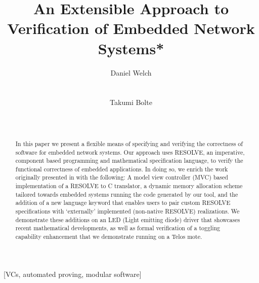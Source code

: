 \documentclass{sig-alternate}
\begin{document}
\title{An Extensible Approach to Verification of Embedded Network Systems*}

\author{
\alignauthor
Daniel Welch\\
\\
\\
\alignauthor
Takumi Bolte\\
\\
\\
}

\maketitle
\begin{abstract}

In this paper we present a flexible means of specifying and verifying the correctness of software for embedded network systems. Our approach uses RESOLVE, an imperative, component based programming and mathematical specification language, to verify the functional correctness of embedded applications. In doing so, we enrich the work originally presented in \cite{regula:2010} with the following: A model view controller (MVC) based implementation of a RESOLVE to C translator, a dynamic memory allocation scheme tailored towards embedded systems running the code generated by our tool, and the addition of a new language keyword that enables users to pair custom RESOLVE specifications with `externally' implemented (non-native RESOLVE) realizations. We demonstrate these additions on an LED (Light emitting diode) driver that showcases recent mathematical developments, as well as formal verification of a toggling capability enhancement that we demonstrate running on a Telos mote.
\end{abstract}

[VCs, automated proving, modular software]
\end{document}
